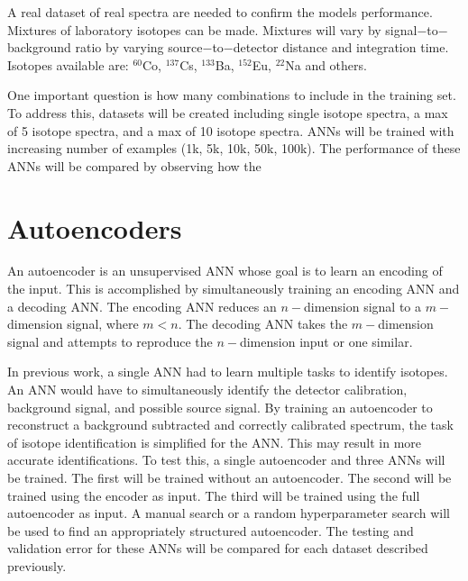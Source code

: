 \documentclass[tocnosub,noragright,centerchapter,12pt,fullpage]{uiucecethesis09}
\begin{document}
A real dataset of real spectra are needed to confirm the models performance. Mixtures of laboratory isotopes can be made. Mixtures will vary by signal$-$to$-$background ratio by varying source$-$to$-$detector distance and integration time. Isotopes available are: $^{60}$Co, $^{137}$Cs, $^{133}$Ba, $^{152}$Eu, $^{22}$Na and others. %

One important question is how many combinations to include in the training set. To address this, datasets will be created including single isotope spectra, a max of 5 isotope spectra, and a max of 10 isotope spectra. ANNs will be trained with increasing number of examples (1k, 5k, 10k, 50k, 100k). The performance of these ANNs will be compared by observing how the 



\section{Autoencoders}


An autoencoder is an unsupervised ANN whose goal is to learn an encoding of the input. This is accomplished by simultaneously training an encoding ANN and a decoding ANN. The encoding ANN reduces an $n-$dimension signal to a $m-$dimension signal, where $m < n$. The decoding ANN takes the $m-$dimension signal and attempts to reproduce the $n-$dimension input or one similar.

In previous work, a single ANN had to learn multiple tasks to identify isotopes. An ANN would have to simultaneously identify the detector calibration, background signal, and possible source signal. By training an autoencoder to reconstruct a background subtracted and correctly calibrated spectrum, the task of isotope identification is simplified for the ANN. This may result in more accurate identifications. To test this, a single autoencoder and three ANNs will be trained. The first will be trained without an autoencoder. The second will be trained using the encoder as input. The third will be trained using the full autoencoder as input. A manual search or a random hyperparameter search will be used to find an appropriately structured autoencoder. The testing and validation error for these ANNs will be compared for each dataset described previously.
\end{document}
